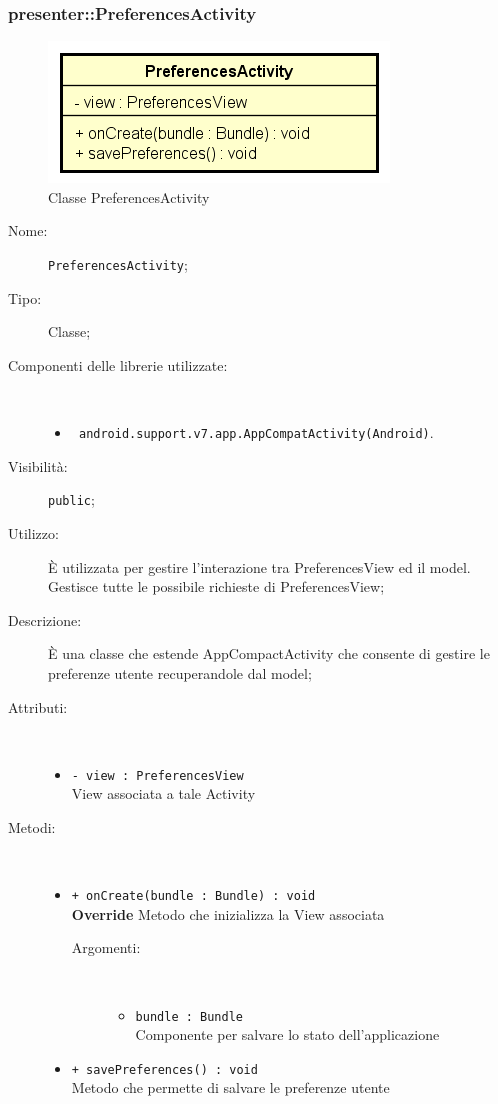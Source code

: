\documentclass[../DefinizioneDiProdotto.tex]{subfiles}
\begin{document}
\subsubsection{presenter::PreferencesActivity}

    \begin{figure}[H]
        \centering
        \includegraphics{img/PreferencesActivity.png}
        \caption{Classe PreferencesActivity}\label{fig:presenter::PreferencesActivity} 
    \end{figure}
    \begin{description}
\item[Nome:] \texttt{PreferencesActivity};
\item[Tipo:] Classe;
\item[Componenti delle librerie utilizzate:] \
\begin{itemize}
\item \texttt{ android.support.v7.app.AppCompatActivity(Android)}.

\end{itemize}
\item[Visibilità:] \texttt{public};
\item[Utilizzo:] È utilizzata per gestire l'interazione tra PreferencesView ed il model. Gestisce tutte le possibile richieste di PreferencesView;
\item[Descrizione:] È una classe che estende AppCompactActivity che consente di gestire le preferenze utente recuperandole dal model;
\item[Attributi:] \
\begin{itemize}
\item \texttt{- view : PreferencesView}\\
View associata a tale Activity

\end{itemize}
\item[Metodi:] \
\begin{itemize}
\item \texttt{+ onCreate(bundle : Bundle) : void}\\
\textbf{Override} Metodo che inizializza la View associata
 \begin{description}
\item[Argomenti:] \
\begin{itemize}
\item \texttt{bundle : Bundle}\\
Componente per salvare lo stato dell'applicazione\end{itemize}
\end{description}
\item \texttt{+ savePreferences() : void}\\
Metodo che permette di salvare le preferenze utente
 \end{itemize}
\end{description}
\end{document}
